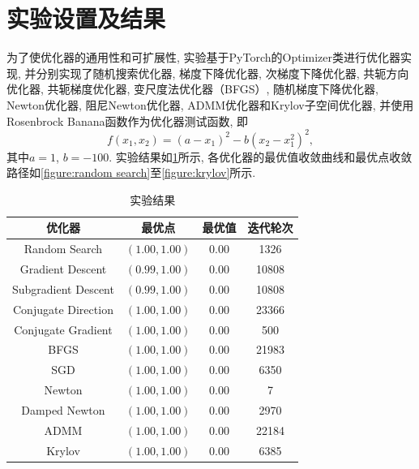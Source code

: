 \section{实验设置及结果}

为了使优化器的通用性和可扩展性, 实验基于PyTorch的Optimizer类进行优化器实现, 并分别实现了随机搜索优化器, 梯度下降优化器, 次梯度下降优化器, 共轭方向优化器, 共轭梯度优化器, 变尺度法优化器（BFGS）, 随机梯度下降优化器, Newton优化器, 阻尼Newton优化器, ADMM优化器和Krylov子空间优化器, 并使用Rosenbrock Banana函数作为优化器测试函数, 即
\begin{equation*}
    f(x_1, x_2)=(a-x_1)^2-b(x_2-x_1^2)^2,
\end{equation*}
其中$a=1$, $b=-100$.
实验结果如\cref{table:result}所示, 各优化器的最优值收敛曲线和最优点收敛路径如\cref{figure:random search}至\cref{figure:krylov}所示.

\begin{table}[ht]
    \centering
    \caption{实验结果}
    \label{table:result}
    \begin{tabular}{cccc}
        \toprule
        \textbf{优化器} & \textbf{最优点} & \textbf{最优值} & \textbf{迭代轮次} \\
        \midrule
        Random Search & $(1.00, 1.00)$ & 0.00 & 1326 \\
        Gradient Descent & $(0.99, 1.00)$ & 0.00 & 10808 \\
        Subgradient Descent & $(0.99, 1.00)$ & 0.00 & 10808 \\
        Conjugate Direction & $(1.00, 1.00)$ & 0.00 & 23366 \\
        Conjugate Gradient & $(1.00, 1.00)$ & 0.00 & 500 \\
        BFGS & $(1.00, 1.00)$ & 0.00 & 21983 \\
        SGD & $(1.00, 1.00)$ & 0.00 & 6350 \\
        Newton & $(1.00, 1.00)$ & 0.00 & 7 \\
        Damped Newton & $(1.00, 1.00)$ & 0.00 & 2970 \\
        ADMM & $(1.00, 1.00)$ & 0.00 & 22184 \\
        Krylov & $(1.00, 1.00)$ & 0.00 & 6385 \\
        \bottomrule
    \end{tabular}
\end{table}

